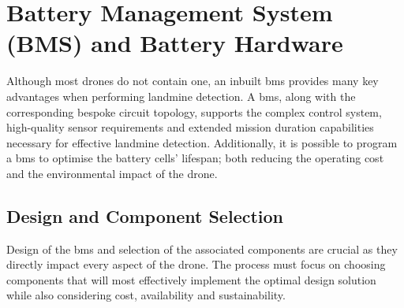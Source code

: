


\section{Battery Management System (BMS) and Battery Hardware}
\label{sec:bms}

Although most drones do not contain one, an inbuilt \acrshort{bms} \cite{SON2023120186} provides many key advantages when performing landmine detection. A \acrshort{bms}, along with the corresponding bespoke circuit topology, supports the complex control system, high-quality sensor requirements and extended mission duration capabilities necessary for effective landmine detection. Additionally, it is possible to program a \acrshort{bms} to optimise the battery cells’ lifespan; both reducing the operating cost and the environmental impact of the drone.

\subsection{Design and Component Selection}

Design of the \acrshort{bms} and selection of the associated components are crucial as they directly impact every aspect of the drone. The process must focus on choosing components that will most effectively implement the optimal design solution while also considering cost, availability and sustainability. 


